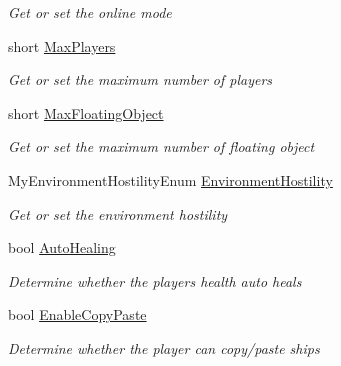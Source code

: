 \begin{DoxyCompactItemize}
\begin{DoxyCompactList}\small\item\em Get or set the online mode \end{DoxyCompactList}\item 
short \hyperlink{class_s_e_mod_a_p_i_1_1_a_p_i_1_1_definitions_1_1_dedicated_config_definition_a4b5950d6f187ff7ec9f1482cf81f35c9}{Max\+Players}
\begin{DoxyCompactList}\small\item\em Get or set the maximum number of players \end{DoxyCompactList}\item 
short \hyperlink{class_s_e_mod_a_p_i_1_1_a_p_i_1_1_definitions_1_1_dedicated_config_definition_af39dad2555eedb600898ea168980ba3c}{Max\+Floating\+Object}
\begin{DoxyCompactList}\small\item\em Get or set the maximum number of floating object \end{DoxyCompactList}\item 
My\+Environment\+Hostility\+Enum \hyperlink{class_s_e_mod_a_p_i_1_1_a_p_i_1_1_definitions_1_1_dedicated_config_definition_a017fdedf60d9c19ad636d8e15be61819}{Environment\+Hostility}
\begin{DoxyCompactList}\small\item\em Get or set the environment hostility \end{DoxyCompactList}\item 
bool \hyperlink{class_s_e_mod_a_p_i_1_1_a_p_i_1_1_definitions_1_1_dedicated_config_definition_ad5a09f299b7af580a4c13457dd3a37a9}{Auto\+Healing}
\begin{DoxyCompactList}\small\item\em Determine whether the player\textquotesingle{}s health auto heals \end{DoxyCompactList}\item 
bool \hyperlink{class_s_e_mod_a_p_i_1_1_a_p_i_1_1_definitions_1_1_dedicated_config_definition_a2af9123d4cd9b483116e161b38d5de8d}{Enable\+Copy\+Paste}
\begin{DoxyCompactList}\small\item\em Determine whether the player can copy/paste ships \end{DoxyCompactList}\item 

\end{DoxyCompactItemize}
